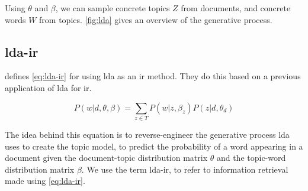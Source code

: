 Using $\theta$ and $\beta$, we can sample concrete topics $Z$ from documents, and concrete words $W$ from topics.
\autoref{fig:lda} gives an overview of the generative process.


\subsection{\gls{lda}-\gls{ir}}
\citeauthor{yang2009topic}\cite{yang2009topic} defines \autoref{eq:lda-ir} for using \gls{lda} as an \gls{ir} method. 
They do this based on a previous application of \gls{lda} for \gls{ir}\cite{lda-ir}.

\begin{equation}\label{eq:lda-ir}
	P(w|d, \theta, \beta) = \sum_{z \in T} P(w|z,\beta_z) P(z|d,\theta_d)
\end{equation}

The idea behind this equation is to reverse-engineer the generative process \gls{lda} uses to create the topic model, to predict the probability of a word appearing in a document given the document-topic distribution matrix $\theta$ and the topic-word distribution matrix $\beta$.
We use the term \gls{lda}-\gls{ir}, to refer to information retrieval made using \autoref{eq:lda-ir}.
